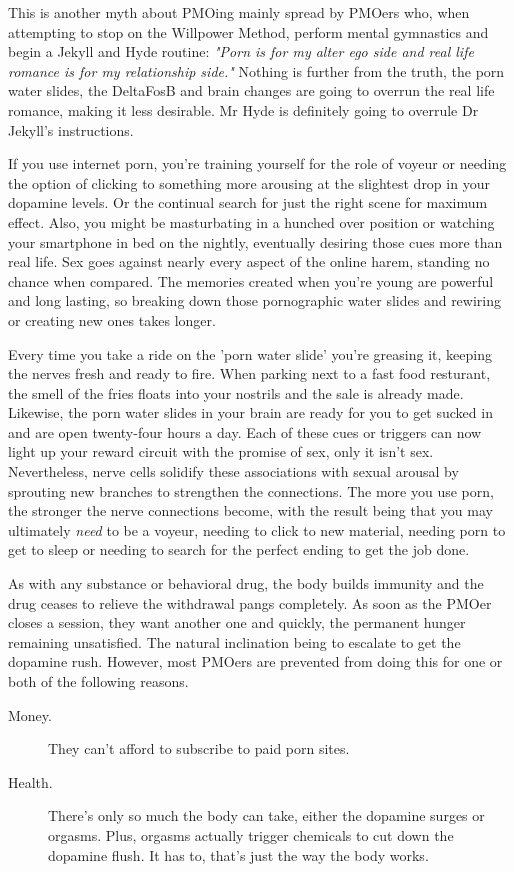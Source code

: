 \documentclass[easypeasy.tex]{subfiles}
\begin{document}
This is another myth about PMOing mainly spread by PMOers who, when attempting to stop on the Willpower Method, perform mental gymnastics and begin a Jekyll and Hyde routine: \textit{"Porn is for my alter ego side and real life romance is for my relationship side."} Nothing is further from the truth, the porn water slides, the DeltaFosB and brain changes are going to overrun the real life romance, making it less desirable. Mr Hyde is definitely going to overrule Dr Jekyll's instructions.

If you use internet porn, you're training yourself for the role of voyeur or needing the option of clicking to something more arousing at the slightest drop in your dopamine levels. Or the continual search for just the right scene for maximum effect. Also, you might be masturbating in a hunched over position or watching your smartphone in bed on the nightly, eventually desiring those cues more than real life. Sex goes against nearly every aspect of the online harem, standing no chance when compared. The memories created when you're young are powerful and long lasting, so breaking down those pornographic water slides and rewiring or creating new ones takes longer.

Every time you take a ride on the 'porn water slide' you're greasing it, keeping the nerves fresh and ready to fire. When parking next to a fast food resturant, the smell of the fries floats into your nostrils and the sale is already made. Likewise, the porn water slides in your brain are ready for you to get sucked in and are open twenty-four hours a day. Each of these cues or triggers can now light up your reward circuit with the promise of sex, only it isn't sex. Nevertheless, nerve cells solidify these associations with sexual arousal by sprouting new branches to strengthen the connections. The more you use porn, the stronger the nerve connections become, with the result being that you may ultimately \textit{need} to be a voyeur, needing to click to new material, needing porn to get to sleep or needing to search for the perfect ending to get the job done.

As with any substance or behavioral drug, the body builds immunity and the drug ceases to relieve the withdrawal pangs completely. As soon as the PMOer closes a session, they want another one and quickly, the permanent hunger remaining unsatisfied. The natural inclination being to escalate to get the dopamine rush. However, most PMOers are prevented from doing this for one or both of the following reasons.
  \begin{description}
    \item [Money.] They can't afford to subscribe to paid porn sites.
    \item [Health.]There's only so much the body can take, either the dopamine surges or orgasms. Plus, orgasms actually trigger chemicals to cut down the dopamine flush. It has to, that's just the way the body works.
  \end{description}
\end{document}
